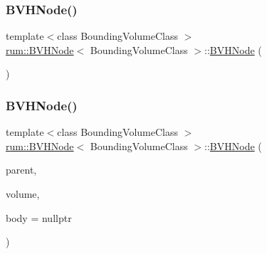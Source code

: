 \subsubsection{\texorpdfstring{B\+V\+H\+Node()}{BVHNode()}\hspace{0.1cm}{\footnotesize\ttfamily [1/2]}}
{\footnotesize\ttfamily template$<$class Bounding\+Volume\+Class $>$ \\
\mbox{\hyperlink{classrum_1_1_b_v_h_node}{rum\+::\+B\+V\+H\+Node}}$<$ Bounding\+Volume\+Class $>$\+::\mbox{\hyperlink{classrum_1_1_b_v_h_node}{B\+V\+H\+Node}} (\begin{DoxyParamCaption}{ }\end{DoxyParamCaption})\hspace{0.3cm}{\ttfamily [default]}}

\mbox{\label{classrum_1_1_b_v_h_node_a4d6bef35007d6473eefe2ce8979e2e2c}} 
\subsubsection{\texorpdfstring{B\+V\+H\+Node()}{BVHNode()}\hspace{0.1cm}{\footnotesize\ttfamily [2/2]}}
{\footnotesize\ttfamily template$<$class Bounding\+Volume\+Class $>$ \\
\mbox{\hyperlink{classrum_1_1_b_v_h_node}{rum\+::\+B\+V\+H\+Node}}$<$ Bounding\+Volume\+Class $>$\+::\mbox{\hyperlink{classrum_1_1_b_v_h_node}{B\+V\+H\+Node}} (\begin{DoxyParamCaption}\item[{\mbox{\hyperlink{classrum_1_1_b_v_h_node}{B\+V\+H\+Node}}$<$ Bounding\+Volume\+Class $>$ $\ast$}]{parent,  }\item[{const Bounding\+Volume\+Class \&}]{volume,  }\item[{\mbox{\hyperlink{classrum_1_1_rigid_body}{Rigid\+Body}} $\ast$}]{body = {\ttfamily nullptr} }\end{DoxyParamCaption})}

\mbox{\label{classrum_1_1_b_v_h_node_a97283b0dd8f0cf52762da014a94ade0b}} 
